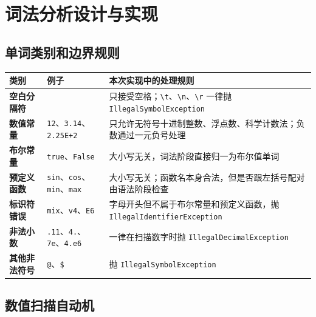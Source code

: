 \documentclass[12pt,a4paper,fontset=none]{ctexart}
\begin{document}
\section{词法分析设计与实现}

\subsection{单词类别和边界规则}

\begin{table}[H]
  \centering
  \begin{tabularx}{\textwidth}{>{\bfseries}P{2.8cm}P{4.7cm}Y}
    \toprule
    类别 & 例子 & 本次实现中的处理规则 \\
    \midrule
    空白分隔符 & \texttt{ } & 只接受空格；\texttt{\textbackslash t}、\texttt{\textbackslash n}、\texttt{\textbackslash r} 一律抛 \texttt{IllegalSymbolException} \\
    数值常量 & \texttt{12}、\texttt{3.14}、\texttt{2.25E+2} & 只允许无符号十进制整数、浮点数、科学计数法；负数通过一元负号处理 \\
    布尔常量 & \texttt{true}、\texttt{False} & 大小写无关，词法阶段直接归一为布尔值单词 \\
    预定义函数 & \texttt{sin}、\texttt{cos}、\texttt{min}、\texttt{max} & 大小写无关；函数名本身合法，但是否跟左括号配对由语法阶段检查 \\
    标识符错误 & \texttt{mix}、\texttt{v4}、\texttt{E6} & 字母开头但不属于布尔常量和预定义函数，抛 \texttt{IllegalIdentifierException} \\
    非法小数 & \texttt{.11}、\texttt{4.}、\texttt{7e}、\texttt{4.e6} & 一律在扫描数字时抛 \texttt{IllegalDecimalException} \\
    其他非法符号 & \texttt{@}、\texttt{\$} & 抛 \texttt{IllegalSymbolException} \\
    \bottomrule
  \end{tabularx}
\end{table}

\subsection{数值扫描自动机}
\end{document}
